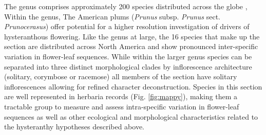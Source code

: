 \documentclass{article}\usepackage[]{graphicx}\usepackage[]{color}
\begin{document}
\noindent The genus  comprises approximately 200 species distributed across the globe \citep{Chin:2014wu}, Within the genus, The American plums (\textit{Prunus} subsp. \textit{Prunus} sect. \textit{Prunocerasus}) offer potential for a higher resolution investigation of drivers of hysteranthous flowering. Like the genus at large, the 16 species that make up the section are distributed across North America and show pronounced inter-specific variation in flower-leaf sequences. While within the larger genus species can be separated into three distinct morphological clades by inflorescence architecture (solitary, corymbose or racemose) all members of the section have solitary inflorescences \citep{Shaw:2004aa} allowing for  refined character deconstruction. Species in this section are well represented in herbaria records (Fig. \ref{fig:mappy}), making them a tractable group to measure and assess intra-specific variation in flower-leaf sequences as well as other ecological and morphological characteristics related to the hysteranthy hypotheses described above. 

\end{document}
